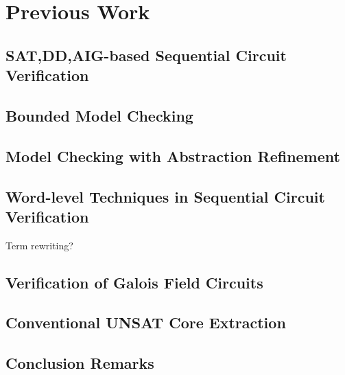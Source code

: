 \chapter{Previous Work}
\label{ch:prev}
\section{SAT,DD,AIG-based Sequential Circuit Verification}

\section{Bounded Model Checking}

\section{Model Checking with Abstraction Refinement}

\section{Word-level Techniques in Sequential Circuit Verification}
Term rewriting?

\section{Verification of Galois Field Circuits}

\section{Conventional UNSAT Core Extraction}

\section{Conclusion Remarks}